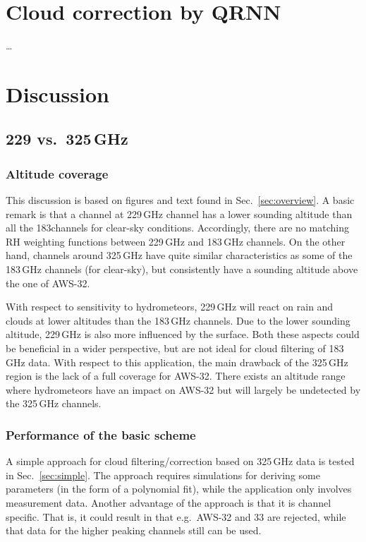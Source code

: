 \documentclass[12pt]{article}
\begin{document}
\section{Cloud correction by QRNN}
%
\dots


\section{Discussion}

\subsection{229 vs.\ 325\,GHz}


\subsubsection{Altitude coverage}
%
This discussion is based on figures and text found in Sec.~\ref{sec:overview}.
A basic remark is that a channel at 229\,GHz channel has a lower sounding
altitude than all the 183\GHz channels for clear-sky conditions. Accordingly,
there are no matching RH weighting functions between 229\,GHz and 183\,GHz
channels. On the other hand, channels around 325\,GHz have quite similar
characteristics as some of the 183\,GHz channels (for clear-sky), but
consistently have a sounding altitude above the one of AWS-32.

With respect to sensitivity to hydrometeors, 229\,GHz will react on rain and
clouds at lower altitudes than the 183\,GHz channels. Due to the lower sounding
altitude, 229\,GHz is also more influenced by the surface. Both these aspects
could be beneficial in a wider perspective, but are not ideal for cloud
filtering of 183\,GHz data. With respect to this application, the main drawback
of the 325\,GHz region is the lack of a full coverage for AWS-32. There exists
an altitude range where hydrometeors have an impact on AWS-32 but will largely
be undetected by the 325\,GHz channels.


\subsubsection{Performance of the basic scheme}
%
A simple approach for cloud filtering/correction based on 325\,GHz data is
tested in Sec.~\ref{sec:simple}. The approach requires simulations for deriving
some parameters (in the form of a polynomial fit), while the application only
involves measurement data. Another advantage of the approach is that it is
channel specific. That is, it could result in that e.g.\ AWS-32 and 33 are
rejected, while that data for the higher peaking channels still can be used.
\end{document}
